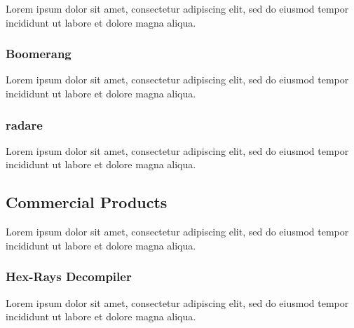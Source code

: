 \documentclass[12pt, a4paper]{article}
\begin{document}
Lorem ipsum dolor sit amet, consectetur adipiscing elit, sed do eiusmod tempor incididunt ut labore et dolore magna aliqua.


\subsubsection{Boomerang}

Lorem ipsum dolor sit amet, consectetur adipiscing elit, sed do eiusmod tempor incididunt ut labore et dolore magna aliqua.

\cite{boomerang}


\subsubsection{radare}

Lorem ipsum dolor sit amet, consectetur adipiscing elit, sed do eiusmod tempor incididunt ut labore et dolore magna aliqua.

\cite{radare}


\subsection{Commercial Products}

Lorem ipsum dolor sit amet, consectetur adipiscing elit, sed do eiusmod tempor incididunt ut labore et dolore magna aliqua.



\subsubsection{Hex-Rays Decompiler}

Lorem ipsum dolor sit amet, consectetur adipiscing elit, sed do eiusmod tempor incididunt ut labore et dolore magna aliqua.

\cite{hexrays}

\end{document}
